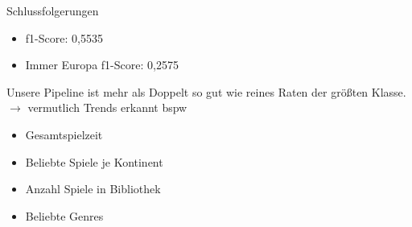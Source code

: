 \documentclass[12pt]{beamer}
\begin{document}
\begin{frame}[fragile]{Schlussfolgerungen}
\begin{itemize}
\item f1-Score: 0,5535
\item Immer Europa f1-Score: 0,2575
\end{itemize}
Unsere Pipeline ist mehr als Doppelt so gut wie reines Raten der größten Klasse. \\
$ \rightarrow $ vermutlich Trends erkannt bspw
\begin{itemize}
\item Gesamtspielzeit
\item Beliebte Spiele je Kontinent
\item Anzahl Spiele in Bibliothek
\item Beliebte Genres
\end{itemize}  
\end{frame}
\end{document}
